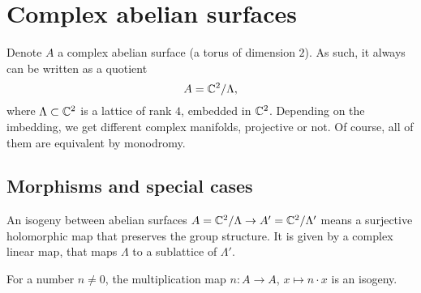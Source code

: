 \section{Complex abelian surfaces}
Denote $A$ a complex abelian surface (a torus of dimension $2$). As such, it always can be written as a quotient
$$
A = \mathbb{C}^2/\Lambda,
$$
where $\Lambda\subset \mathbb{C}^2$ is a lattice of rank $4$, embedded in $\mathbb{C}^2$. 
Depending on the imbedding, we get different complex manifolds, projective or not. Of course, all of them are equivalent by monodromy.
\subsection{Morphisms and special cases}
\begin{definition}
An isogeny between abelian surfaces $A=\mathbb{C}^2/\Lambda\rightarrow A'=\mathbb{C}^2/\Lambda'$ means a surjective holomorphic map that preserves the group structure. It is given by a complex linear map, that maps $\Lambda$ to a sublattice of $\Lambda'$. 
\end{definition}
\begin{example}
For a number $n\neq 0$, the multiplication map $n: A\rightarrow A$, $x\mapsto n\cdot x$ is an isogeny.
\end{example}



